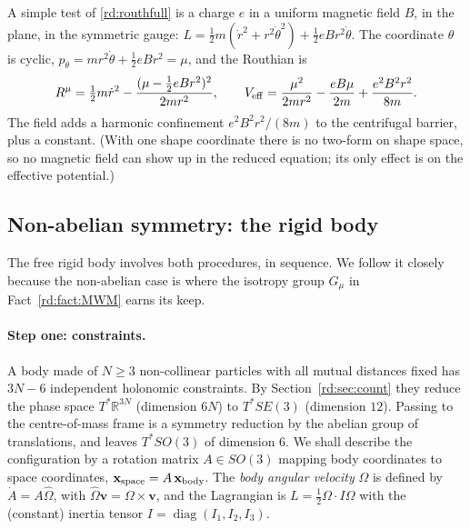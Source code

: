 A simple test of \eqref{rd:routhfull} is a charge $e$ in a uniform magnetic field $B$, in the plane, in the symmetric gauge: $L=\tfrac12m(\dot r^2+r^2\dot\theta^2)+\tfrac12eBr^2\dot\theta$. The coordinate $\theta$ is cyclic, $p_\theta=mr^2\dot\theta+\tfrac12eBr^2=\mu$, and the Routhian is
\begin{equation}\label{rd:landau}
R^\mu=\tfrac12m\dot r^2-\frac{(\mu-\tfrac12eBr^2)^2}{2mr^2},\qquad
V_{\rm eff}=\frac{\mu^2}{2mr^2}-\frac{eB\mu}{2m}+\frac{e^2B^2r^2}{8m}.
\end{equation}
The field adds a harmonic confinement $e^2B^2r^2/(8m)$ to the centrifugal barrier, plus a constant. (With one shape coordinate there is no two-form on shape space, so no magnetic field can show up in the reduced equation; its only effect is on the effective potential.)

\subsection{Non-abelian symmetry: the rigid body}\label{rd:sec:rigid}

The free rigid body involves both procedures, in sequence. We follow it closely because the non-abelian case is where the isotropy group $G_\mu$ in Fact~\ref{rd:fact:MWM} earns its keep.

\paragraph{Step one: constraints.} A body made of $N\ge3$ non-collinear particles with all mutual distances fixed has $3N-6$ independent holonomic constraints. By Section~\ref{rd:sec:count} they reduce the phase space $T^*\mathbb R^{3N}$ (dimension $6N$) to $T^*SE(3)$ (dimension $12$). Passing to the centre-of-mass frame is a symmetry reduction by the abelian group of translations, and leaves $T^*SO(3)$ of dimension $6$. We shall describe the configuration by a rotation matrix $A\in SO(3)$ mapping body coordinates to space coordinates, $\mathbf x_{\rm space}=A\,\mathbf x_{\rm body}$. The \emph{body angular velocity} $\Omega$ is defined by $\dot A=A\hat\Omega$, with $\hat\Omega\mathbf v=\Omega\times\mathbf v$, and the Lagrangian is $L=\tfrac12\Omega\cdot I\Omega$ with the (constant) inertia tensor $I=\operatorname{diag}(I_1,I_2,I_3)$.

